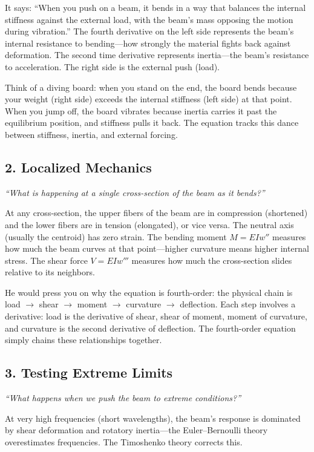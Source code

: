 \documentclass[11pt,openright]{book}
\begin{document}
It says: ``When you push on a beam, it bends in a way that balances the internal stiffness against the external load, with the beam's mass opposing the motion during vibration.'' The fourth derivative on the left side represents the beam's internal resistance to bending---how strongly the material fights back against deformation. The second time derivative represents inertia---the beam's resistance to acceleration. The right side is the external push (load).

Think of a diving board: when you stand on the end, the board bends because your weight (right side) exceeds the internal stiffness (left side) at that point. When you jump off, the board vibrates because inertia carries it past the equilibrium position, and stiffness pulls it back. The equation tracks this dance between stiffness, inertia, and external forcing.

\subsection*{2. Localized Mechanics}
\textit{``What is happening at a single cross-section of the beam as it bends?''}

At any cross-section, the upper fibers of the beam are in compression (shortened) and the lower fibers are in tension (elongated), or vice versa. The neutral axis (usually the centroid) has zero strain. The bending moment $M = EIw''$ measures how much the beam curves at that point---higher curvature means higher internal stress. The shear force $V = EIw'''$ measures how much the cross-section slides relative to its neighbors.

He would press you on why the equation is fourth-order: the physical chain is load $\to$ shear $\to$ moment $\to$ curvature $\to$ deflection. Each step involves a derivative: load is the derivative of shear, shear of moment, moment of curvature, and curvature is the second derivative of deflection. The fourth-order equation simply chains these relationships together.

\subsection*{3. Testing Extreme Limits}
\textit{``What happens when we push the beam to extreme conditions?''}

At very high frequencies (short wavelengths), the beam's response is dominated by shear deformation and rotatory inertia---the Euler--Bernoulli theory overestimates frequencies. The Timoshenko theory corrects this.
\end{document}
